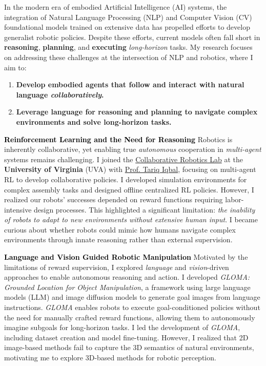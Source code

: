 \documentclass[11pt]{article}
\newcommand{\statement}[1]{\medskip\noindent
  \textcolor{black}{\textbf{#1}}\space
}
\begin{document}
\noindent In the modern era of embodied Artificial Intelligence (AI) systems, the integration of Natural Language Processing (NLP) and Computer Vision (CV) foundational models trained on extensive data has propelled efforts to develop generalist robotic policies. Despite these efforts, current models often fall short in \textbf{reasoning}, \textbf{planning}, and \textbf{executing} \textit{long-horizon} tasks. My research focuses on addressing these challenges at the intersection of NLP and robotics, where I aim to:
\begin{enumerate}[label=(\arabic*), itemindent=0pt, itemsep=0pt, parsep=0pt, nosep]
  \item \textbf{Develop embodied agents that follow and interact with natural language \textit{collaboratively}.}
  \item \textbf{Leverage language for reasoning and planning to navigate complex environments and solve long-horizon tasks.}
\end{enumerate}

\statement{Reinforcement Learning and the Need for Reasoning} Robotics is inherently collaborative, yet enabling true \textit{autonomous} cooperation in \textit{multi-agent} systems remains challenging. I joined the \href{https://www.collabrobotics.com/}{Collaborative Robotics Lab} at the \textbf{University of Virginia} (UVA) with \href{https://www.tiqbal.com/}{Prof. Tariq Iqbal}, focusing on multi-agent RL to develop collaborative policies. I developed simulation environments for complex assembly tasks and designed offline centralized RL policies. However, I realized our robots' successes depended on reward functions requiring labor-intensive design processes. This highlighted a significant limitation: \textit{the inability of robots to adapt to new environments without extensive human input}. I became curious about whether robots could mimic how humans navigate complex environments through innate reasoning rather than external supervision.

\statement{Language and Vision Guided Robotic Manipulation} Motivated by the limitations of reward supervision, I explored \textit{language} and \textit{vision}-driven approaches to enable autonomous reasoning and action. I developed \textit{GLOMA: Grounded Location for Object Manipulation}, a framework using large language models (LLM) and image diffusion models to generate goal images from language instructions. \textit{GLOMA} enables robots to execute goal-conditioned policies without the need for manually crafted reward functions, allowing them to autonomously imagine subgoals for long-horizon tasks. I led the development of \textit{GLOMA}, including dataset creation and model fine-tuning. However, I realized that 2D image-based methods fail to capture the 3D semantics of natural environments, motivating me to explore 3D-based methods for robotic perception.
\end{document}
